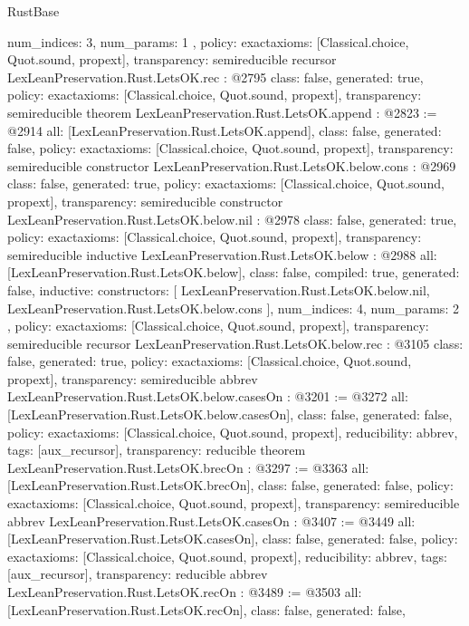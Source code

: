 \begin{lexlean}{RustBase}
\begin{coremodule}
{{    num_indices: 3,
    num_params: 1
  },
  policy: exact{axioms: [Classical.choice, Quot.sound, propext]},
  transparency: semireducible
}
recursor LexLeanPreservation.Rust.LetsOK.rec : @2795 {
  class: false,
  generated: true,
  policy: exact{axioms: [Classical.choice, Quot.sound, propext]},
  transparency: semireducible
}
theorem LexLeanPreservation.Rust.LetsOK.append : @2823 := @2914 {
  all: [LexLeanPreservation.Rust.LetsOK.append],
  class: false,
  generated: false,
  policy: exact{axioms: [Classical.choice, Quot.sound, propext]},
  transparency: semireducible
}
constructor LexLeanPreservation.Rust.LetsOK.below.cons : @2969 {
  class: false,
  generated: true,
  policy: exact{axioms: [Classical.choice, Quot.sound, propext]},
  transparency: semireducible
}
constructor LexLeanPreservation.Rust.LetsOK.below.nil : @2978 {
  class: false,
  generated: true,
  policy: exact{axioms: [Classical.choice, Quot.sound, propext]},
  transparency: semireducible
}
inductive LexLeanPreservation.Rust.LetsOK.below : @2988 {
  all: [LexLeanPreservation.Rust.LetsOK.below],
  class: false,
  compiled: true,
  generated: false,
  inductive: {
    constructors: [
      LexLeanPreservation.Rust.LetsOK.below.nil,
      LexLeanPreservation.Rust.LetsOK.below.cons
    ],
    num_indices: 4,
    num_params: 2
  },
  policy: exact{axioms: [Classical.choice, Quot.sound, propext]},
  transparency: semireducible
}
recursor LexLeanPreservation.Rust.LetsOK.below.rec : @3105 {
  class: false,
  generated: true,
  policy: exact{axioms: [Classical.choice, Quot.sound, propext]},
  transparency: semireducible
}
abbrev LexLeanPreservation.Rust.LetsOK.below.casesOn : @3201 := @3272 {
  all: [LexLeanPreservation.Rust.LetsOK.below.casesOn],
  class: false,
  generated: false,
  policy: exact{axioms: [Classical.choice, Quot.sound, propext]},
  reducibility: abbrev{},
  tags: [aux_recursor],
  transparency: reducible
}
theorem LexLeanPreservation.Rust.LetsOK.brecOn : @3297 := @3363 {
  all: [LexLeanPreservation.Rust.LetsOK.brecOn],
  class: false,
  generated: false,
  policy: exact{axioms: [Classical.choice, Quot.sound, propext]},
  transparency: semireducible
}
abbrev LexLeanPreservation.Rust.LetsOK.casesOn : @3407 := @3449 {
  all: [LexLeanPreservation.Rust.LetsOK.casesOn],
  class: false,
  generated: false,
  policy: exact{axioms: [Classical.choice, Quot.sound, propext]},
  reducibility: abbrev{},
  tags: [aux_recursor],
  transparency: reducible
}
abbrev LexLeanPreservation.Rust.LetsOK.recOn : @3489 := @3503 {
  all: [LexLeanPreservation.Rust.LetsOK.recOn],
  class: false,
  generated: false,
}
\end{coremodule}
\end{lexlean}
